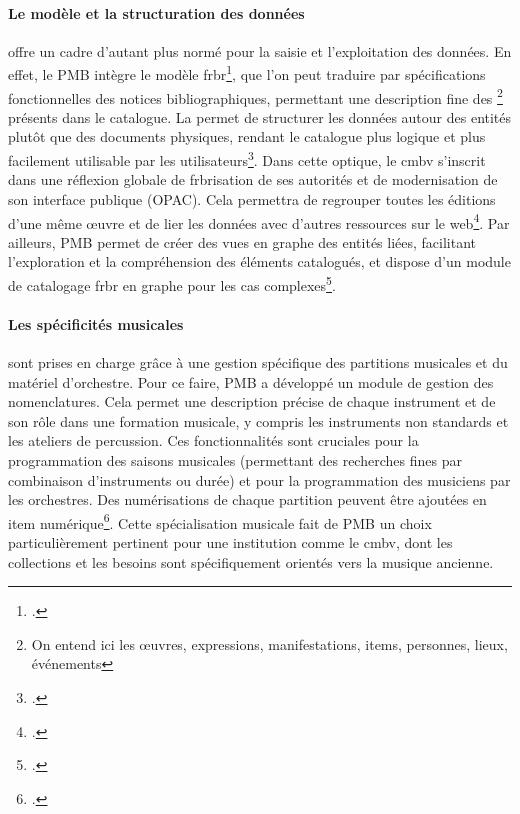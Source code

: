 \paragraph{Le modèle  et la structuration des données} offre un cadre d'autant plus normé pour la saisie et l'exploitation des données. En effet, le PMB intègre le modèle \gls{frbr}\footcite{PlaquettePMB}, que l'on peut traduire par spécifications fonctionnelles des notices bibliographiques, permettant une description fine des \footnote{On entend ici les œuvres, expressions, manifestations, items, personnes, lieux, événements} présents dans le catalogue. La  permet de structurer les données autour des entités plutôt que des documents physiques, rendant le catalogue plus logique et plus facilement utilisable par les utilisateurs\footcite{bermesVersCatalogueOriente2016}. Dans cette optique, le \gls{cmbv} s'inscrit dans une réflexion globale de \gls{frbr}isation de ses autorités et de modernisation de son interface publique (OPAC). Cela permettra de regrouper toutes les éditions d'une même œuvre et de lier les données avec d'autres ressources sur le web\footcite{marcolocascioMigrationBaseDonnees2024a}. Par ailleurs, PMB permet de créer des vues en graphe des entités liées, facilitant l'exploration et la compréhension des éléments catalogués, et dispose d'un module de catalogage \gls{frbr} en graphe pour les cas complexes\footcite{servicesApplyFRBRModel}.

\paragraph{Les spécificités musicales} sont prises en charge grâce à une gestion spécifique des partitions musicales et du matériel d'orchestre. Pour ce faire, PMB a développé un module de gestion des nomenclatures. Cela permet une description précise de chaque instrument et de son rôle dans une formation musicale, y compris les instruments non standards et les ateliers de percussion. Ces fonctionnalités sont cruciales pour la programmation des saisons musicales (permettant des recherches fines par combinaison d'instruments ou durée) et pour la programmation des musiciens par les orchestres. Des numérisations de chaque partition peuvent être ajoutées en item numérique\footcite{servicesGerezVosPartitions}. Cette spécialisation musicale fait de PMB un choix particulièrement pertinent pour une institution comme le \gls{cmbv}, dont les collections et les besoins sont spécifiquement orientés vers la musique ancienne.

